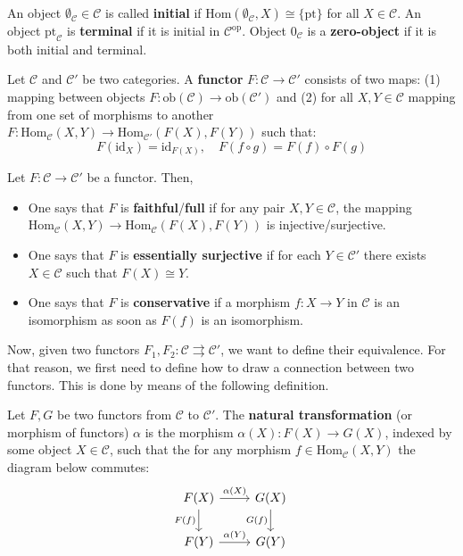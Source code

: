 \documentclass{category-template}
\begin{document}
\begin{definition}
    An object $\emptyset_{\mathcal{C}} \in \mathcal{C}$ is called
    \textbf{initial} if $\text{Hom}(\emptyset_{\mathcal{C}}, X) \cong
    \{\text{pt}\}$ for all $X \in \mathcal{C}$. An object
    $\text{pt}_{\mathcal{C}}$ is \textbf{terminal} if it is initial in
    $\mathcal{C}^{\text{op}}$. Object $0_{\mathcal{C}}$ is a
    \textbf{zero-object} if it is both initial and terminal.
\end{definition}

\begin{definition}[Functor]
    Let $\mathcal{C}$ and $\mathcal{C}'$ be two categories. A \textbf{functor}
    $F: \mathcal{C} \to \mathcal{C}'$ consists of two maps: (1) mapping between
    objects $F: \text{ob}(\mathcal{C}) \to \text{ob}(\mathcal{C}')$ and (2) for
    all $X,Y \in \mathcal{C}$ mapping from one set of morphisms to another $F:
    \text{Hom}_{\mathcal{C}}(X,Y) \to \text{Hom}_{\mathcal{C}'}(F(X),F(Y))$ such
    that:
    \begin{equation*}
        F(\text{id}_X) = \text{id}_{F(X)}, \quad F(f \circ g) = F(f) \circ F(g)
    \end{equation*}
\end{definition}

\begin{definition}
    Let $F: \mathcal{C} \to \mathcal{C}'$ be a functor. Then,
    \begin{itemize}
        \item One says that $F$ is \textbf{faithful}/\textbf{full} if for any
        pair $X,Y \in \mathcal{C}$, the mapping $\text{Hom}_{\mathcal{C}}(X,Y)
        \to \text{Hom}_{\mathcal{C}}(F(X),F(Y))$ is injective/surjective.
        \item One says that $F$ is \textbf{essentially surjective} if for each
        $Y \in \mathcal{C}'$ there exists $X \in \mathcal{C}$ such that $F(X)
        \cong Y$.
        \item One says that $F$ is \textbf{conservative} if a morphism $f: X \to
        Y$ in $\mathcal{C}$ is an isomorphism as soon as $F(f)$ is an
        isomorphism.
    \end{itemize}
\end{definition}

Now, given two functors $F_1,F_2: \mathcal{C}\rightrightarrows \mathcal{C}'$, we
want to define their equivalence. For that reason, we first need to define how
to draw a connection between two functors. This is done by means of the
following definition.
\begin{definition}
Let $F,G$ be two functors from $\mathcal{C}$ to $\mathcal{C}'$. The
\textbf{natural transformation} (or morphism of functors) $\alpha$ is the
morphism $\alpha(X): F(X) \to G(X)$, indexed by some object $X \in \mathcal{C}$,
such that the for any morphism $f \in \text{Hom}_{\mathcal{C}}(X,Y)$ the diagram below commutes:
\[\begin{tikzcd}
F(X) \arrow{r}{\alpha(X)} \arrow[swap]{d}{F(f)} & G(X) \arrow[swap]{d}{G(f)} \\
F(Y) \arrow{r}{\alpha(Y)} & G(Y)
\end{tikzcd}
\]
\end{definition}
\end{document}

